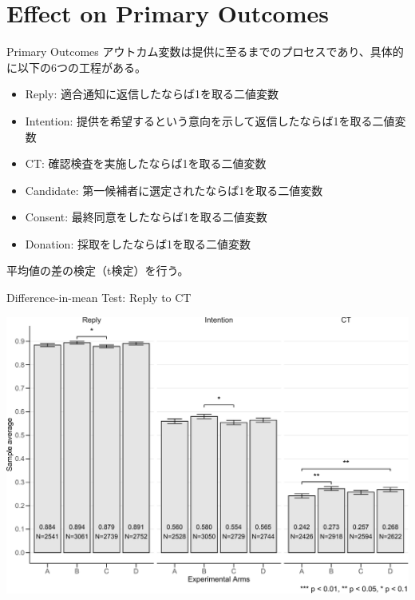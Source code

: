 \documentclass[
      aspectratio=169,
        12pt,
    ]{beamer}
\providecommand{\tightlist}{%
  \setlength{\itemsep}{0pt}\setlength{\parskip}{0pt}}
\begin{document}
\hypertarget{effect-on-primary-outcomes}{%
\section{Effect on Primary Outcomes}\label{effect-on-primary-outcomes}}

\begin{frame}{Primary Outcomes}
\protect\hypertarget{primary-outcomes}{}
アウトカム変数は提供に至るまでのプロセスであり、具体的に以下の6つの工程がある。

\begin{itemize}
\tightlist
\item
  Reply: 適合通知に返信したならば1を取る二値変数
\item
  Intention: 提供を希望するという意向を示して返信したならば1を取る二値変数
\item
  CT: 確認検査を実施したならば1を取る二値変数
\item
  Candidate: 第一候補者に選定されたならば1を取る二値変数
\item
  Consent: 最終同意をしたならば1を取る二値変数
\item
  Donation: 採取をしたならば1を取る二値変数
\end{itemize}

平均値の差の検定（t検定）を行う。
\end{frame}

\begin{frame}{Difference-in-mean Test: Reply to CT}
\protect\hypertarget{difference-in-mean-test-reply-to-ct}{}
\begin{center}\includegraphics[width=0.75\linewidth]{report_files/figure-beamer/ttest-first-3step-1} \end{center}
\end{frame}
\end{document}
